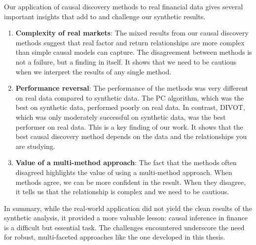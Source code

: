 Our application of causal discovery methods to real financial data gives several important insights that add to and challenge our synthetic results.
\begin{enumerate}
    \item \textbf{Complexity of real markets}: The mixed results from our causal discovery methods suggest that real factor and return relationships are more complex than simple causal models can capture. The disagreement between methods is not a failure, but a finding in itself. It shows that we need to be cautious when we interpret the results of any single method.
    \item \textbf{Performance reversal}: The performance of the methods was very different on real data compared to synthetic data. The PC algorithm, which was the best on synthetic data, performed poorly on real data. In contrast, DIVOT, which was only moderately successful on synthetic data, was the best performer on real data. This is a key finding of our work. It shows that the best causal discovery method depends on the data and the relationships you are studying.
    \item \textbf{Value of a multi-method approach}: The fact that the methods often disagreed highlights the value of using a multi-method approach. When methods agree, we can be more confident in the result. When they disagree, it tells us that the relationship is complex and we need to be cautious.
\end{enumerate}

In summary, while the real-world application did not yield the clean results of the synthetic analysis, it provided a more valuable lesson: causal inference in finance is a difficult but essential task. The challenges encountered underscore the need for robust, multi-faceted approaches like the one developed in this thesis.